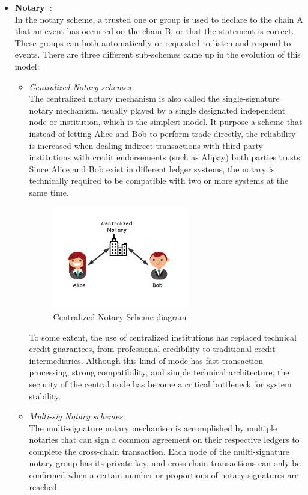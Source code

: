 \begin{itemize}
    \item \textbf{Notary~\cite{buterin2016chain}}:\\
    In the notary scheme, a trusted one or group is used to declare to the chain A that an event has occurred on the chain B, or that the statement is correct. These groups can both automatically or requested to listen and respond to events. There are three different sub-schemes came up in the evolution of this model: 
    \begin{itemize}
        \item \textit{Centralized Notary schemes}\\
        The centralized notary mechanism is also called the single-signature notary mechanism, usually played by a single designated independent node or institution, which is the simplest model. It purpose a scheme that instead of letting Alice and Bob to perform trade directly, the reliability is increased when dealing indirect transactions with third-party institutions with credit endorsements (such as Alipay) both parties trusts. Since Alice and Bob exist in different ledger systems, the notary is technically required to be compatible with two or more systems at the same time.
        \begin{figure}[H]
        \includegraphics[width=0.6\textwidth]{./figures/cnotary.png}
        \centering
        \caption{Centralized Notary Scheme diagram}%
        \centering
        \label{fig:cno}
        \end{figure}
        To some extent, the use of centralized institutions has replaced technical credit guarantees, from professional credibility to traditional credit intermediaries. Although this kind of mode has fast transaction processing, strong compatibility, and simple technical architecture, the security of the central node has become a critical bottleneck for system stability.
        \item \textit{Multi-sig Notary schemes}\\
       The multi-signature notary mechanism is accomplished by multiple notaries that can sign a common agreement on their respective ledgers to complete the cross-chain transaction. Each node of the multi-signature notary group has its private key, and cross-chain transactions can only be confirmed when a certain number or proportions of notary signatures are reached.


\end{itemize}
\end{itemize}
